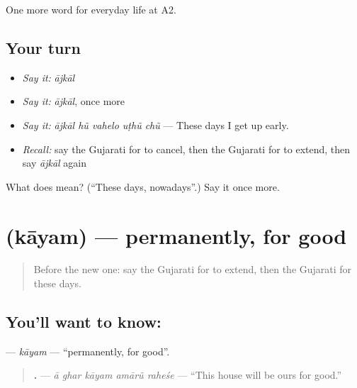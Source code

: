 \begin{grammarlens}[title={What you've built}]
One more word for everyday life at A2.
\end{grammarlens}

\subsection*{Your turn}
\begin{itemize}
\raggedright
  \item \emph{Say it:} \emph{ājkāl}
  \item \emph{Say it:} \emph{ājkāl}, once more
  \item \emph{Say it:} \emph{ājkāl hũ vahelo uṭhũ chũ} — These days I get up early.
  \item \emph{Recall:} say the Gujarati for to cancel, then the Gujarati for to extend, then say \emph{ājkāl} again
\end{itemize}

\begin{tcolorbox}[breakable,colback=teal!4,colframe=teal!35!black,title={Before you move on}]
What does  mean? (\textquotedblleft{}These days, nowadays\textquotedblright{}.) Say it once more.
\end{tcolorbox}
\section[\texorpdfstring{\gu{કાયમ} (kāyam)}{કાયમ (kāyam)}]{ (kāyam) — permanently, for good}

\label{lesson:GU-C182-kayam}



\begin{quote}
Before the new one: say the Gujarati for to extend, then the Gujarati for these days.
\end{quote}

\subsection*{You'll want to know: }
\textbf{} — \emph{kāyam} — \textquotedblleft{}permanently, for good\textquotedblright{}.

\begin{quote}
\textbf{    .} — \emph{ā ghar kāyam amārũ raheśe} — \textquotedblleft{}This house will be ours for good.\textquotedblright{}
\end{quote}


